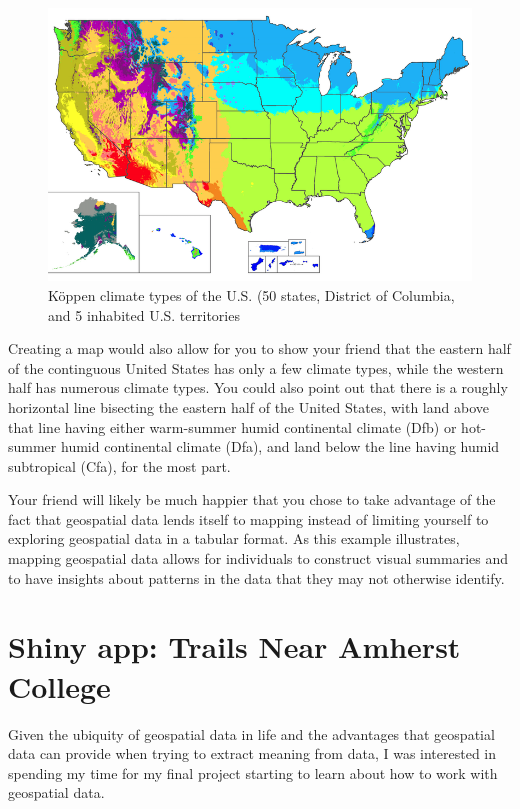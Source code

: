 \documentclass[12pt]{article}
\begin{document}
\begin{figure}

{\centering \includegraphics[width=0.75\linewidth]{images/US-climate-map} 

}

\caption{Köppen climate types of the U.S. (50 states, District of Columbia, and 5 inhabited U.S. territories}\label{fig:unnamed-chunk-3}
\end{figure}

Creating a map would also allow for you to show your friend that the
eastern half of the continguous United States has only a few climate
types, while the western half has numerous climate types. You could also
point out that there is a roughly horizontal line bisecting the eastern
half of the United States, with land above that line having either
warm-summer humid continental climate (Dfb) or hot-summer humid
continental climate (Dfa), and land below the line having humid
subtropical (Cfa), for the most part.

Your friend will likely be much happier that you chose to take advantage
of the fact that geospatial data lends itself to mapping instead of
limiting yourself to exploring geospatial data in a tabular format. As
this example illustrates, mapping geospatial data allows for individuals
to construct visual summaries and to have insights about patterns in the
data that they may not otherwise identify.

\hypertarget{shiny-app-trails-near-amherst-college}{%
\section{Shiny app: Trails Near Amherst
College}\label{shiny-app-trails-near-amherst-college}}

Given the ubiquity of geospatial data in life and the advantages that
geospatial data can provide when trying to extract meaning from data, I
was interested in spending my time for my final project starting to
learn about how to work with geospatial data.
\end{document}
